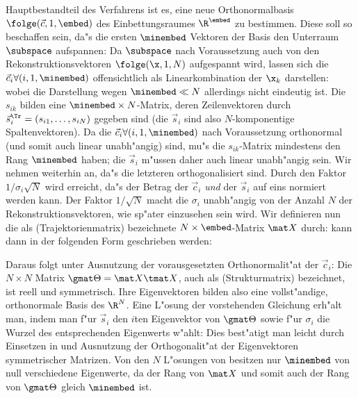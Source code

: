 Hauptbestandteil des Verfahrens ist es, eine neue Orthonormalbasis $\folge(\vec
c,1,\embed)$ des Einbettungsraumes $\R^\embed$ zu bestimmen. Diese soll so beschaffen sein,
da"s die ersten $\minembed$ Vektoren der Basis den Unterraum $\subspace$ aufspannen:
Da $\subspace$ nach Voraussetzung auch von den Rekonstruktionsvektoren $\folge(\x,1,N)$
aufgespannt wird, lassen sich die $\vec c_i\forall(i,1,\minembed)$ offensichtlich als
Linearkombination der $\x_k$ darstellen:
wobei die Darstellung wegen $\minembed\ll N$ allerdings nicht eindeutig ist.  Die $s_{ik}$
bilden eine $\minembed\times N$-Matrix, deren Zeilenvektoren durch
$\vec s_i^\Tr = (s_{i1},\dots,s_{iN})$ gegeben sind (die $\vec s_i$ sind also $N$-komponentige Spaltenvektoren).  Da die $\vec c_i\forall(i,1,\minembed)$
nach Voraussetzung orthonormal (und somit auch linear unabh"angig) sind, mu"s die
$s_{ik}$-Matrix mindestens 
  den Rang $\minembed$ haben; die $\vec s_i$ m"ussen daher auch
linear unabh"angig sein.  Wir nehmen weiterhin an, da"s die letzteren orthogonalisiert
sind. Durch den Faktor $1/\sigma_i\sqrt N$ wird erreicht, da"s der Betrag der $\vec c_i$
{\em und} der $\vec s_i$ auf eins normiert werden kann. Der Faktor $1/\sqrt N$ macht die
$\sigma_i$ unabh"angig von der Anzahl $N$ der Rekonstruktionsvektoren, wie sp"ater
einzusehen sein wird.  Wir definieren nun die als \begriff(Trajektorienmatrix) bezeichnete
$N\times \embed$-Matrix $\mat X$ durch:
 kann dann in der folgenden Form geschrieben werden: 

Daraus folgt unter Ausnutzung der vorausgesetzten Orthonormalit"at der $\vec c_i$:
Die $N\times N$ Matrix $\gmat \Theta = \mat X \tmat X$,  auch
als \begriff(Strukturmatrix) bezeichnet, ist reell und symmetrisch. Ihre
Eigenvektoren bilden also eine vollst"andige, orthonormale Basis des $\R^N$. 
Eine L"osung der vorstehenden Gleichung erh"alt man, indem man f"ur $\vec s_i$ 
den $i$ten Eigenvektor von $\gmat \Theta$ sowie f"ur $\sigma_i$ die Wurzel des entsprechenden Eigenwerts w"ahlt:
Dies best"atigt man leicht durch Einsetzen in  und Ausnutzung der Orthogonalit"at der
Eigenvektoren symmetrischer Matrizen. Von den $N$ L"osungen von 
besitzen nur $\minembed$ von null verschiedene Eigenwerte, da der Rang von $\mat X$
und somit auch der Rang von $\gmat\Theta$ gleich $\minembed$ ist. 

